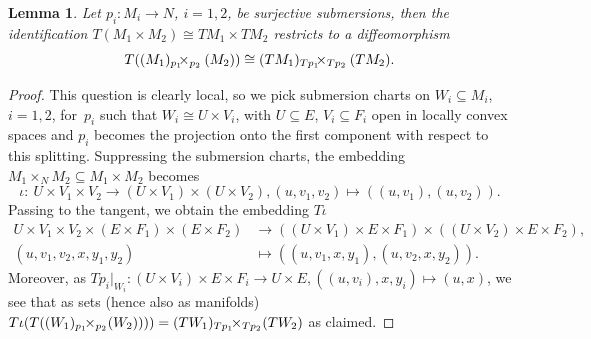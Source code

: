 \documentclass[11pt]{article}
\numberwithin{equation}{section}
\numberwithin{equation}{section}
\newtheorem{Lemma}[Theorem]{Lemma}
\begin{document}
\begin{Lemma}\label{lem:tangent_fibreprod}
Let $p_i \colon M_i \rightarrow N$, $i=1,2$, be surjective submersions, then the identification $T(M_1\times M_2) \cong TM_1 \times TM_2$ restricts to a diffeomorphism
\begin{displaymath}
 T((M_1) {}_{p_1}\hspace{-.5em}\times_{p_2} (M_2) ) \cong (TM_1) {}_{Tp_1}\hspace{-.5em}\times_{Tp_2} (TM_2).\end{displaymath}
\end{Lemma}

\begin{proof}
This question is clearly local, so we pick submersion charts on $W_i \subseteq M_i$, $i=1,2$, for~$p_i$ such that $W_i \cong U \times V_i$, with $U\subseteq E$, $V_i \subseteq F_i$ open in locally convex spaces and $p_i$ becomes the projection onto the first component with respect to this splitting. Suppressing the submersion charts, the embedding $M_1\times_N M_2 \subseteq M_1 \times M_2$ becomes
\begin{displaymath}
 \iota \colon\ U \times V_1 \times V_2 \rightarrow (U\times V_1) \times (U \times V_2), (u,v_1,v_2) \mapsto ((u,v_1),(u,v_2)).
\end{displaymath}
Passing to the tangent, we obtain the embedding $T\iota$
\begin{align*}
 U \times V_1 \times V_2 \times (E \times F_1) \times (E\times F_2) &\rightarrow ((U\times V_1)\times E\times F_1)\times ((U\times V_2)\times E\times F_2),\\
 (u,v_1,v_2,x,y_1,y_2)&\mapsto ((u,v_1,x,y_1),(u,v_2,x,y_2) ).
\end{align*}
Moreover, as $Tp_i|_{W_i} \colon (U \times V_i) \times E \times F_i \rightarrow U\times E, ((u,v_i),x,y_i) \mapsto (u,x)$, we see that as sets (hence also as manifolds) $T\iota (T((W_1){}_{p_1}\hspace{-.4em}\times_{p_2} \hspace{-.2em} (W_2)) ) ) =(TW_1){}_{Tp_1}\hspace{-.4em}\times_{Tp_2}\hspace{-.2em}(TW_2)$ as claimed.
\end{proof}
\end{document}
